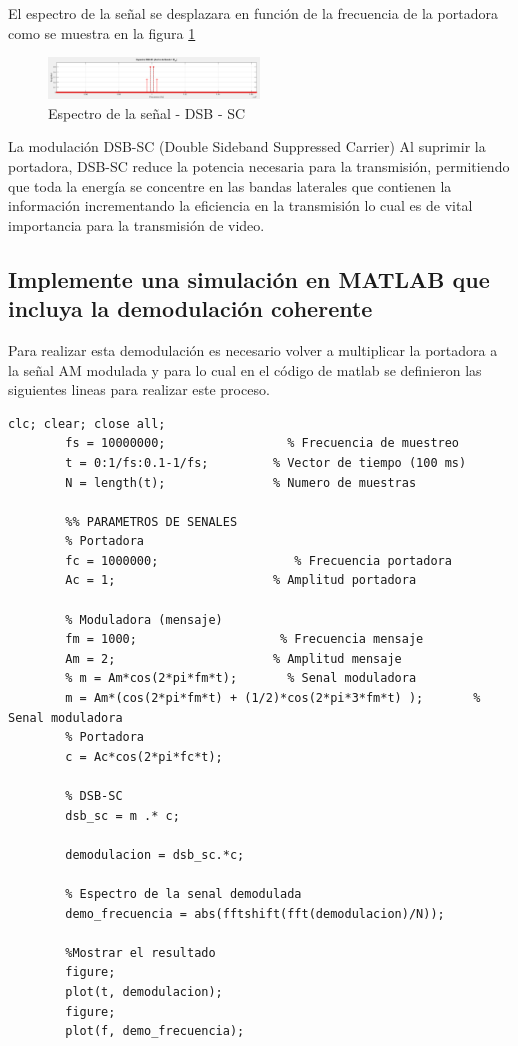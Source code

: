 \documentclass[conference]{IEEEtran}
\begin{document}
	El espectro de la señal se desplazara en función de la frecuencia de la portadora como se muestra en la figura \ref{fig:dbs-sc-espectro}
	\begin{figure}[h]
		\centering
		\includegraphics[width=0.5\textwidth]{media/dbs-sc-espectro}
		\caption{Espectro de la señal - DSB - SC}
		\label{fig:dbs-sc-espectro}
	\end{figure}
	
	La modulación DSB-SC (Double Sideband Suppressed Carrier) Al suprimir la portadora, DSB-SC reduce la potencia necesaria para la transmisión, permitiendo que toda la energía se concentre en las bandas laterales que contienen la información incrementando la eficiencia en la transmisión lo cual es de vital importancia para la transmisión de video.
	
	\subsection{Implemente una simulación en MATLAB que incluya la demodulación coherente}
	Para realizar esta demodulación es necesario volver a multiplicar la portadora a la señal AM modulada y para lo cual en el código de matlab se definieron las siguientes lineas para realizar este proceso.
	
	\begin{lstlisting}[caption={}, numbers=none]
		clc; clear; close all;
		fs = 10000000;                 % Frecuencia de muestreo
		t = 0:1/fs:0.1-1/fs;         % Vector de tiempo (100 ms)
		N = length(t);               % Numero de muestras
		
		%% PARAMETROS DE SENALES
		% Portadora
		fc = 1000000;                   % Frecuencia portadora
		Ac = 1;                      % Amplitud portadora
		
		% Moduladora (mensaje)
		fm = 1000;                    % Frecuencia mensaje
		Am = 2;                      % Amplitud mensaje
		% m = Am*cos(2*pi*fm*t);       % Senal moduladora
		m = Am*(cos(2*pi*fm*t) + (1/2)*cos(2*pi*3*fm*t) );       % Senal moduladora
		% Portadora
		c = Ac*cos(2*pi*fc*t);
		
		% DSB-SC
		dsb_sc = m .* c;
		
		demodulacion = dsb_sc.*c;
		
		% Espectro de la senal demodulada
		demo_frecuencia = abs(fftshift(fft(demodulacion)/N));
		
		%Mostrar el resultado
		figure;
		plot(t, demodulacion); 
		figure;
		plot(f, demo_frecuencia);
	\end{lstlisting}
	
\end{document}
